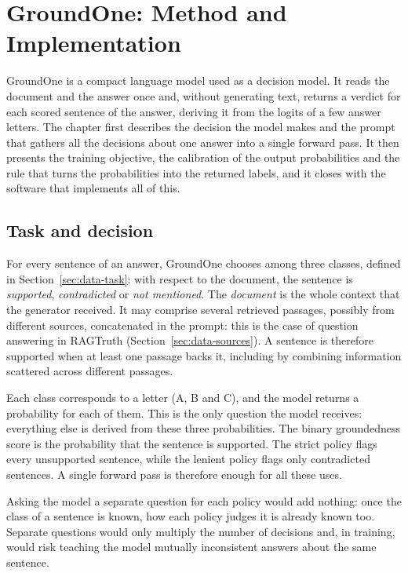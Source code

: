 \chapter{GroundOne: Method and Implementation}
\label{sec:method}


GroundOne is a compact language model used as a decision model. It reads the document and the answer once and, without
generating text, returns a verdict for each scored sentence of the answer, deriving it from the logits of a few answer
letters. The chapter first describes the decision the model makes and the prompt that gathers all the decisions about
one answer into a single forward pass. It then presents the training objective, the calibration of the output
probabilities and the rule that turns the probabilities into the returned labels, and it closes with the software that
implements all of this.

\section{Task and decision}
\label{sec:method-task}

For every sentence of an answer, GroundOne chooses among three classes, defined in Section~\ref{sec:data-task}: with
respect to the document, the sentence is \emph{supported}, \emph{contradicted} or \emph{not mentioned}. The
\emph{document} is the whole context that the generator received. It may comprise several retrieved passages, possibly
from different sources, concatenated in the prompt: this is the case of question answering in RAGTruth
(Section~\ref{sec:data-sources}). A sentence is therefore supported when at least one passage backs it, including by
combining information scattered across different passages.

Each class
corresponds to a letter (A, B and C), and the model returns a probability for each of them. This is the only question
the model receives: everything else is derived from these three probabilities. The binary groundedness score is the
probability that the sentence is supported. The strict policy flags every unsupported sentence, while the lenient
policy flags only contradicted sentences. A single forward pass is therefore enough for all these uses.

Asking the model a separate question for each policy would add nothing: once the class of a sentence is known, how each policy judges it is already known too. Separate questions would only multiply the number of decisions and, in
training, would risk teaching the model mutually inconsistent answers about the same sentence.

